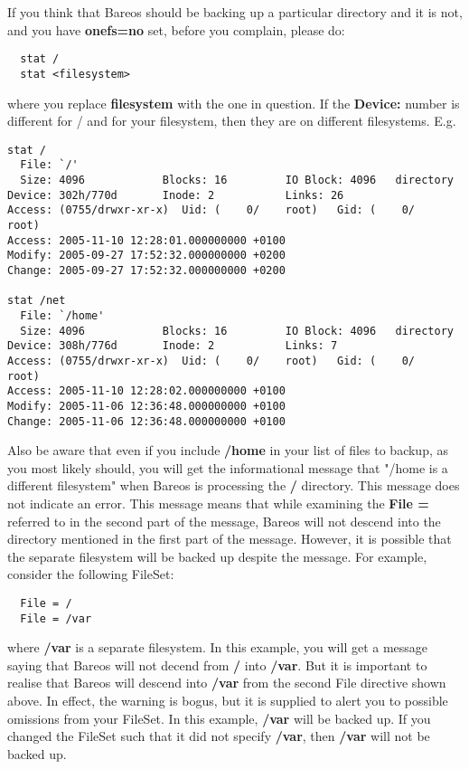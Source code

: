 \begin{description}
   If you think that Bareos should be backing up a particular directory
   and it is not, and you have {\bf onefs=no} set, before you complain,
   please do:

\footnotesize
\begin{verbatim}
  stat /
  stat <filesystem>
\end{verbatim}
\normalsize

where you replace {\bf filesystem} with the one in question.  If the
{\bf Device:} number is different for / and for your filesystem, then they
are on different filesystems.  E.g.
\footnotesize
\begin{verbatim}
stat /
  File: `/'
  Size: 4096            Blocks: 16         IO Block: 4096   directory
Device: 302h/770d       Inode: 2           Links: 26
Access: (0755/drwxr-xr-x)  Uid: (    0/    root)   Gid: (    0/    root)
Access: 2005-11-10 12:28:01.000000000 +0100
Modify: 2005-09-27 17:52:32.000000000 +0200
Change: 2005-09-27 17:52:32.000000000 +0200

stat /net
  File: `/home'
  Size: 4096            Blocks: 16         IO Block: 4096   directory
Device: 308h/776d       Inode: 2           Links: 7
Access: (0755/drwxr-xr-x)  Uid: (    0/    root)   Gid: (    0/    root)
Access: 2005-11-10 12:28:02.000000000 +0100
Modify: 2005-11-06 12:36:48.000000000 +0100
Change: 2005-11-06 12:36:48.000000000 +0100
\end{verbatim}
\normalsize

   Also be aware that even if you include {\bf /home} in your list
   of files to backup, as you most likely should, you will get the
   informational message that  "/home is a different filesystem" when
   Bareos is processing the {\bf /} directory.  This message does not
   indicate an error. This message means that while examining the
   {\bf File =} referred to in the second part of the message, Bareos will
   not descend into the directory mentioned in the first part of the message.
   However, it is possible that the separate filesystem will be backed up
   despite the message. For example, consider the following FileSet:

\footnotesize
\begin{verbatim}
  File = /
  File = /var
\end{verbatim}
\normalsize

   where {\bf /var} is a separate filesystem.  In this example, you will get a
   message saying that Bareos will not decend from {\bf /} into {\bf /var}.  But
   it is important to realise that Bareos will descend into {\bf /var} from the
   second File directive shown above.  In effect, the warning is bogus,
   but it is supplied to alert you to possible omissions from your FileSet. In
   this example, {\bf /var} will be backed up.  If you changed the FileSet such
   that it did not specify {\bf /var}, then {\bf /var} will not be backed up.


\end{description}
